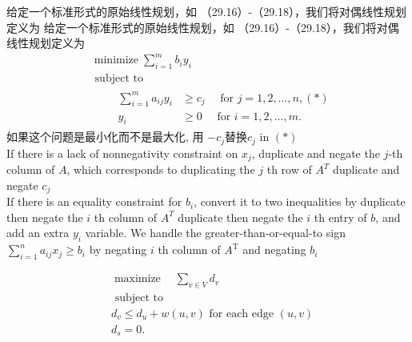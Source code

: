 \documentclass[a4paper, justified]{tufte-handout}
\begin{document}
\begin{solution}
  给定一个标准形式的原始线性规划，如 （29.16）-（29.18），我们将对偶线性规划定义为
  给定一个标准形式的原始线性规划，如 （29.16）-（29.18），我们将对偶线性规划定义为
  $$
    \begin{aligned}
       & \operatorname{minimize} \sum_{i=1}^m b_i y_i                                         \\
       & \text { subject to }                                                                 \\
       & \qquad \begin{aligned}
                  \sum_{i=1}^m a_{i j} y_i & \geq c_j \quad \text { for } j=1,2, \ldots, n, (*) \\
                  y_i                      & \geq 0 \quad \text { for } i=1,2, \ldots, m .
                \end{aligned}
    \end{aligned}
  $$
  如果这个问题是最小化而不是最大化,  用 $-c_j$替换$c_j$  in $(*)$\\
  If there is a lack of nonnegativity constraint on $x_j$, duplicate and negate the $j$-th column of $A$, which corresponds to duplicating the $j$ th row of $A^T$ duplicate and negate $c_j$\\
  If there is an equality constraint for $b_i$, convert it to two inequalities by duplicate then negate the $i$ th column of $A^T$
  duplicate then negate the $i$ th entry of $b$, and add an extra $y_i$ variable.
  We handle the greater-than-or-equal-to sign $\sum_{i=1}^n a_{i j} x_j \geq b_i$ by negating $i$ th column of $A^{\mathrm{T}}$ and negating $b_i$
\end{solution}

\begin{problem}[TC 29.2-3]
\end{problem}

\begin{solution}
  $$
    \begin{aligned}
       & \operatorname{maximize} \quad \sum_{v \in V} d_v   \\
       & \text { subject to }                               \\
       & d_v \leq d_u+w(u, v) \text { for each edge }(u, v) \\
       & d_s=0 \text {. }                                   \\
       &
    \end{aligned}
  $$
\end{solution}
\end{document}
